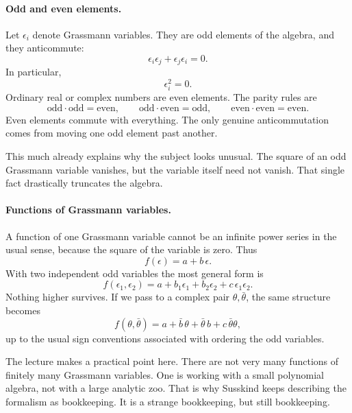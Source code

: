 \paragraph{Odd and even elements.}
Let \(\epsilon_i\) denote Grassmann variables. They are odd elements of the algebra, and they anticommute:
\begin{equation}
\epsilon_i\epsilon_j+\epsilon_j\epsilon_i=0.
\end{equation}
In particular,
\begin{equation}
\epsilon_i^2=0.
\end{equation}
Ordinary real or complex numbers are even elements. The parity rules are
\begin{equation}
\text{odd}\cdot\text{odd}=\text{even},
\qquad
\text{odd}\cdot\text{even}=\text{odd},
\qquad
\text{even}\cdot\text{even}=\text{even}.
\end{equation}
Even elements commute with everything. The only genuine anticommutation comes from moving one odd element past another.

This much already explains why the subject looks unusual. The square of an odd Grassmann variable vanishes, but the variable itself need not vanish. That single fact drastically truncates the algebra.

\paragraph{Functions of Grassmann variables.}
A function of one Grassmann variable cannot be an infinite power series in the usual sense, because the square of the variable is zero. Thus
\begin{equation}
f(\epsilon)=a+b\,\epsilon.
\end{equation}
With two independent odd variables the most general form is
\begin{equation}
f(\epsilon_1,\epsilon_2)=a+b_1\epsilon_1+b_2\epsilon_2+c\,\epsilon_1\epsilon_2.
\end{equation}
Nothing higher survives. If we pass to a complex pair \(\theta,\bar\theta\), the same structure becomes
\begin{equation}
f(\theta,\bar\theta)=a+\bar b\,\theta+\bar\theta\,b+c\,\bar\theta\theta,
\end{equation}
up to the usual sign conventions associated with ordering the odd variables.

The lecture makes a practical point here. There are not very many functions of finitely many Grassmann variables. One is working with a small polynomial algebra, not with a large analytic zoo. That is why Susskind keeps describing the formalism as bookkeeping. It is a strange bookkeeping, but still bookkeeping.

